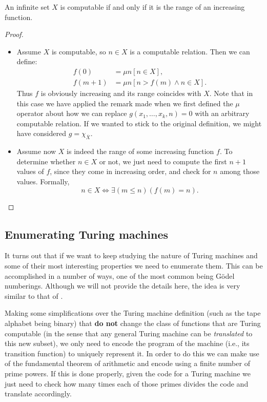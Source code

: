 \documentclass[../main.tex]{memoir}
\begin{document}
\begin{lemma}
  An infinite set $X$ is computable if and only if it is the range of an increasing function.
\end{lemma}
\begin{proof}
  \begin{itemize}
  \item Assume $X$ is computable, so $n \in X$ is a computable relation. Then we can define:
    \begin{align*}
      f(0) & = \mu n [n \in X], \\
      f(m + 1) & = \mu n [n > f(m) \land n \in X].
    \end{align*}
    Thus $f$ is obviously increasing and its range coincides with $X$. Note that in this case we have applied the remark made when we first defined the $\mu$ operator about how we can replace $g(x_1, \ldots, x_k, n) = 0$ with an arbitrary computable relation. If we wanted to stick to the original definition, we might have considered $g = \chi_{\overline{X}}$.
  \item Assume now $X$ is indeed the range of some increasing function $f$. To determine whether $n \in X$ or not, we just need to compute the first $n + 1$ values of $f$, since they come in increasing order, and check for $n$ among those values. Formally,
    \[ n \in X \iff \exists (m \le n) (f(m) = n). \]
  \end{itemize}
\end{proof}

\subsection{Enumerating Turing machines}

It turns out that if we want to keep studying the nature of Turing machines and some of their most interesting properties we need to enumerate them. This can be accomplished in a number of ways, one of the most common being Gödel numberings. Although we will not provide the details here, the idea is very similar to that of .

Making some simplifications over the Turing machine definition (such as the tape alphabet being binary) that \textbf{do not} change the class of functions that are Turing computable (in the sense that any general Turing machine can be \textit{translated} to this new subset), we only need to encode the program of the machine (i.e., its transition function) to uniquely represent it. In order to do this we can make use of the fundamental theorem of arithmetic and encode using a finite number of prime powers. If this is done properly, given the code for a Turing machine we just need to check how many times each of those primes divides the code and translate accordingly.
\end{document}
